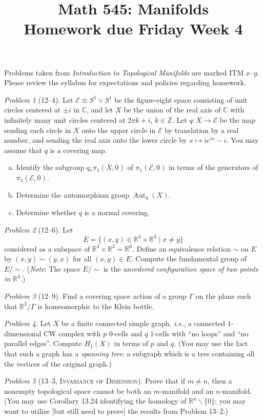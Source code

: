 \documentclass[11pt,twoside]{amsart}
\title{Math 545: Manifolds\\ Homework due Friday Week 4}
\theoremstyle{plain}
\theoremstyle{remark}
\newtheorem{prob}{Problem}
\theoremstyle{definition}
\theoremstyle{definition}
\newcommand{\RR}{\mathbb{R}}
\newcommand{\ZZ}{\mathbb{Z}}
\newcommand{\CC}{\mathbb{C}}
\newcommand{\Aut}{\operatorname{Aut}}
\begin{document}
\maketitle

\noindent Problems taken from \emph{Introduction to Topological Manifolds} are marked ITM $x$--$y$. Please review the syllabus for expectations and policies regarding homework.

\begin{prob}[12--4]
Let $\mathscr E \cong S^1\vee S^1$ be the figure-eight space consisting of unit circles centered at $\pm i$ in $\CC$, and let $X$ be the union of the real axis of $\CC$ with infinitely many unit circles centered at $2\pi k+i$, $k\in \ZZ$. Let $q\colon X\to \mathscr E$ be the map sending each circle in $X$ onto the upper circle in $\mathscr E$ by translation by a real number, and sending the real axis onto the lower circle by $x\mapsto ie^{ix}-i$. You may assume that $q$ is a covering map.
\begin{enumerate}[(a)]
\item Identify the subgroup $q_*\pi_1(X,0)$ of $\pi_1(\mathscr E,0)$ in terms of the generators of $\pi_1(\mathscr E,0)$.
\item Determine the automorphism group $\Aut_q(X)$.
\item Determine whether $q$ is a normal covering.
\end{enumerate}
\end{prob}

\begin{prob}[12--6]
Let
\[
  E = \{(x,y)\in \RR^3\times \RR^3\mid x\ne y\}
\]
considered as a subspace of $\RR^3\times \RR^3=\RR^6$. Define an equivalence relation $\sim$ on $E$ by $(x,y)\sim (y,x)$ for all $(x,y)\in E$. Compute the fundamental group of $E/{\sim}$.  (\emph{Note}: The space $E/{\sim}$ is the \emph{unordered configuration space of two points in $\RR^3$}.)
\end{prob}

\begin{prob}[12--9]
Find a covering space action of a group $\Gamma$ on the plane such that $\RR^2/\Gamma$ is homeomorphic to the Klein bottle.
\end{prob}

\begin{prob}
Let $X$ be a finite connected simple graph, \emph{i.e.}, a connected $1$-dimensional CW complex with $p$ $0$-cells and $q$ $1$-cells with ``no loops'' and ``no parallel edges''. Compute $H_1(X)$ in terms of $p$ and $q$. (You may use the fact that such a graph has a \emph{spanning tree}: a subgraph which is a tree containing all the vertices of the original graph.)
\end{prob}

\begin{prob}[13--3, \textsc{Invariance of Dimension}] Prove that if $m\ne n$, then a nonempty topological space cannot be both an $m$-manifold and an $n$-manifold. (You may use Corollary 13.24 identifying the homology of $\RR^n\smallsetminus \{0\}$; you may want to utilize [but still need to prove] the results from Problem 13--2.)
\end{prob}
\end{document}
